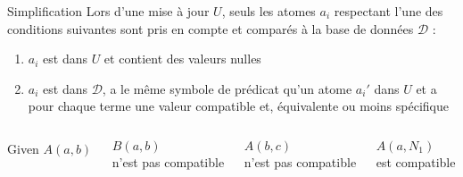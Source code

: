 \begin{frame}{Simplification}
    Lors d'une mise à jour $U$, seuls les atomes $a_i$ respectant l'une des conditions suivantes sont pris en compte et comparés à la base de données $\mathcal{D}$ :
    \vfill
    \begin{enumerate}
        \item $a_i$ est dans $U$ et contient des valeurs nulles
        \pause\vfill
        \item $a_i$ est dans $\mathcal{D}$, a le même symbole de prédicat qu'un atome $a_i'$ dans $U$ et a pour chaque terme une valeur compatible et, équivalente ou moins spécifique
    \end{enumerate}
    \vfill
    \pause
    \begin{columns}
        \begin{column}{.25\textwidth}
            Given $A(a, b)$\\
        \end{column}
        \hfill
        \begin{column}{.25\textwidth}
            \centering
            $B(a, b)$\\ n'est pas compatible
        \end{column}
        \hfill
        \begin{column}{.25\textwidth}
            \centering
            $A(b, c)$\\ n'est pas compatible
        \end{column}
        \hfill
        \begin{column}{.25\textwidth}
            \centering
            $A(a, N_1)$\\ est compatible
        \end{column}
    \end{columns}
\end{frame}

